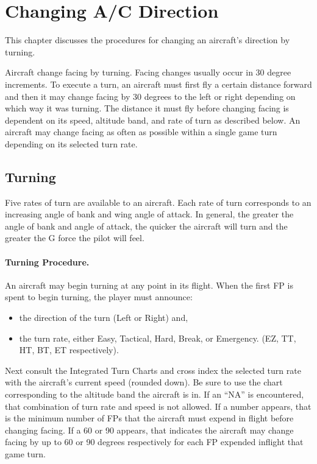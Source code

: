 \section{Changing A/C Direction}

This chapter discusses the procedures for changing an aircraft's direction by turning.

Aircraft change facing by turning. Facing changes usually occur in 30 degree increments. To execute a turn, an aircraft must first fly a certain distance forward and then it may change facing by 30 degrees to the left or right depending on which way it was turning. The distance it must fly before changing facing is dependent on its speed, altitude band, and rate of turn as described below. An aircraft may change facing as often as possible within a single game turn depending on its selected turn rate.

\subsection{Turning}

Five rates of turn are available to an aircraft. Each rate of turn corresponds to an increasing angle of bank and wing angle of attack. In general, the greater the angle of bank and angle of attack, the quicker the aircraft will turn and the greater the G force the pilot will feel.

\paragraph{Turning Procedure.} An aircraft may begin turning at any point in its flight. When the first FP is spent to begin turning, the player must announce:

\begin{itemize}
    \item the direction of the turn (Left or Right) and,
    \item the turn rate, either Easy, Tactical, Hard, Break, or Emergency. (EZ, TT, HT, BT, ET respectively).
\end{itemize}

Next consult the Integrated Turn Charts and cross index the selected turn rate with the aircraft's current speed (rounded down). 
Be sure to use the chart corresponding to the altitude band the aircraft is in. If an “NA” is encountered, that combination of turn rate and speed is not allowed. If a number appears, that is the minimum number of FPs that the aircraft must expend in flight before changing facing. If a 60 or 90 appears, that indicates the aircraft may change facing by up to 60 or 90 degrees respectively for each FP expended inflight that game turn. 


